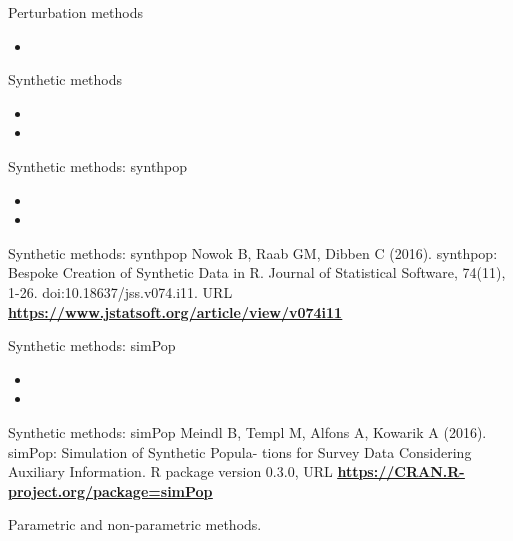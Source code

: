 \documentclass[
  ignorenonframetext,
  aspectratio=169,
]{beamer}
\begin{document}
\begin{frame}{Perturbation methods}
\label{perturbation-methods}
\begin{itemize}
\item
  \color{red}{sdcMicro}
\end{itemize}
\end{frame}

\begin{frame}{Synthetic methods}
\label{synthetic-methods}
\begin{itemize}
\item
  \color{red}{Introduction to synthetic data}
\item
  \Huge \color{red}{for Jiri/Oscar}
\end{itemize}
\end{frame}

\begin{frame}{Synthetic methods: synthpop}
\label{synthetic-methods-synthpop}
\begin{itemize}
\item
  \color{red}{Generating synthetic data with synthpop}
\item
  \Huge \color{red}{for Jiri/Oscar}
\end{itemize}
\end{frame}

\begin{frame}{Synthetic methods: synthpop}
\label{synthetic-methods-synthpop-1}
Nowok B, Raab GM, Dibben C (2016). synthpop: Bespoke Creation of
Synthetic Data in R. Journal of Statistical Software, 74(11), 1-26.
doi:10.18637/jss.v074.i11. URL
\href{https://www.jstatsoft.org/article/view/v074i11}{\color{blue}\underline{\textbf{https://www.jstatsoft.org/article/view/v074i11}}}
\end{frame}

\begin{frame}{Synthetic methods: simPop}
\label{synthetic-methods-simpop}
\begin{itemize}
\item
  \color{red}{Generating synthetic data with simPop}
\item
  \Huge \color{red}{for Jiri/Oscar}
\end{itemize}
\end{frame}

\begin{frame}{Synthetic methods: simPop}
\label{synthetic-methods-simpop-1}
Meindl B, Templ M, Alfons A, Kowarik A (2016). simPop: Simulation of
Synthetic Popula- tions for Survey Data Considering Auxiliary
Information. R package version 0.3.0, URL
\href{https://CRAN.R-project.org/package=simPop}{\color{blue}\underline{\textbf{https://CRAN.R-project.org/package=simPop}}}

Parametric and non-parametric methods.
\end{frame}
\end{document}
